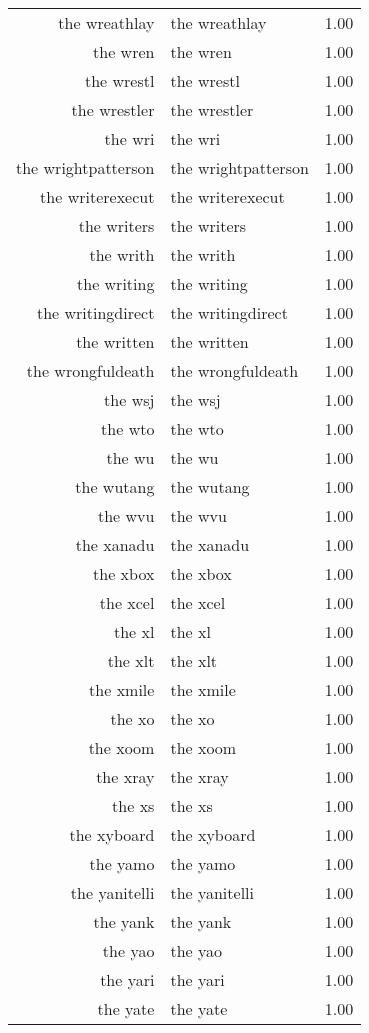 \begin{table}[ht]
\begin{tabular}{rlr}
  the wreathlay & the wreathlay & 1.00 \\ 
  the wren & the wren & 1.00 \\ 
  the wrestl & the wrestl & 1.00 \\ 
  the wrestler & the wrestler & 1.00 \\ 
  the wri & the wri & 1.00 \\ 
  the wrightpatterson & the wrightpatterson & 1.00 \\ 
  the writerexecut & the writerexecut & 1.00 \\ 
  the writers & the writers & 1.00 \\ 
  the writh & the writh & 1.00 \\ 
  the writing & the writing & 1.00 \\ 
  the writingdirect & the writingdirect & 1.00 \\ 
  the written & the written & 1.00 \\ 
  the wrongfuldeath & the wrongfuldeath & 1.00 \\ 
  the wsj & the wsj & 1.00 \\ 
  the wto & the wto & 1.00 \\ 
  the wu & the wu & 1.00 \\ 
  the wutang & the wutang & 1.00 \\ 
  the wvu & the wvu & 1.00 \\ 
  the xanadu & the xanadu & 1.00 \\ 
  the xbox & the xbox & 1.00 \\ 
  the xcel & the xcel & 1.00 \\ 
  the xl & the xl & 1.00 \\ 
  the xlt & the xlt & 1.00 \\ 
  the xmile & the xmile & 1.00 \\ 
  the xo & the xo & 1.00 \\ 
  the xoom & the xoom & 1.00 \\ 
  the xray & the xray & 1.00 \\ 
  the xs & the xs & 1.00 \\ 
  the xyboard & the xyboard & 1.00 \\ 
  the yamo & the yamo & 1.00 \\ 
  the yanitelli & the yanitelli & 1.00 \\ 
  the yank & the yank & 1.00 \\ 
  the yao & the yao & 1.00 \\ 
  the yari & the yari & 1.00 \\ 
  the yate & the yate & 1.00 \\ 

\end{tabular}
\end{table}
